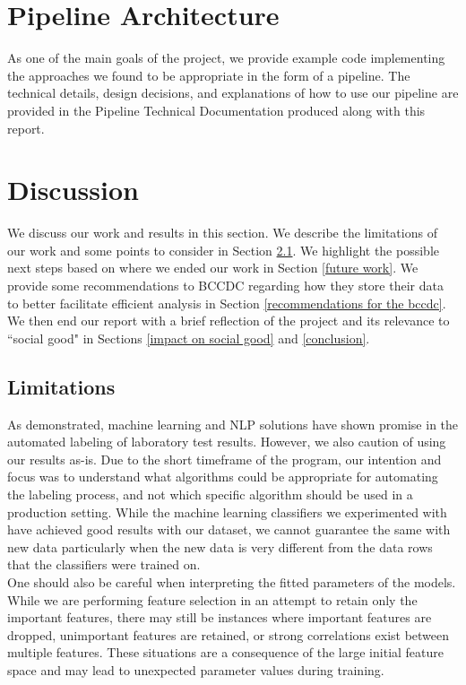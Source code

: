 \documentclass[11pt]{article}
\begin{document}
\section{Pipeline Architecture} \label{pipeline architecture}

As one of the main goals of the project, we provide example code implementing the approaches we found to be appropriate in the form of a pipeline. The technical details, design decisions, and explanations of how to use our pipeline are provided in the Pipeline Technical Documentation produced along with this report.

\section{Discussion} \label{discussion}

We discuss our work and results in this section. We describe the limitations of our work and some points to consider in Section \ref{limitations}. We highlight the possible next steps based on where we ended our work in Section \ref{future work}. We provide some recommendations to BCCDC regarding how they store their data to better facilitate efficient analysis in Section \ref{recommendations for the bccdc}. We then end our report with a brief reflection of the project and its relevance to ``social good" in Sections \ref{impact on social good} and \ref{conclusion}.

\subsection{Limitations}
\label{limitations}

As demonstrated, machine learning and NLP solutions have shown promise in the automated labeling of laboratory test results. However, we also caution of using our results as-is. Due to the short timeframe of the program, our intention and focus was to understand what algorithms could be appropriate for automating the labeling process, and not which specific algorithm should be used in a production setting. While the machine learning classifiers we experimented with have achieved good results with our dataset, we cannot guarantee the same with new data particularly when the new data is very different from the data rows that the classifiers were trained on.
\\

One should also be careful when interpreting the fitted parameters of the models. While we are performing feature selection in an attempt to retain only the important features, there may still be instances where important features are dropped, unimportant features are retained, or strong correlations exist between multiple features. These situations are a consequence of the large initial feature space and may lead to unexpected parameter values during training.
\end{document}
